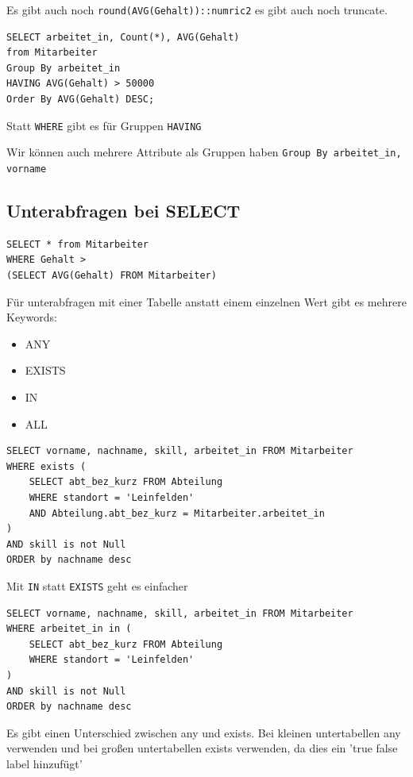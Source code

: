 \documentclass[a4paper]{article}
\begin{document}
Es gibt auch noch \lstinline|round(AVG(Gehalt))::numric2| es gibt auch noch truncate.

\begin{lstlisting}
SELECT arbeitet_in, Count(*), AVG(Gehalt)
from Mitarbeiter
Group By arbeitet_in
HAVING AVG(Gehalt) > 50000
Order By AVG(Gehalt) DESC;
\end{lstlisting}

Statt \lstinline|WHERE| gibt es für Gruppen \lstinline|HAVING|

Wir können auch mehrere Attribute als Gruppen haben \lstinline|Group By arbeitet_in, vorname|

\subsection{Unterabfragen bei SELECT}

\begin{lstlisting}
SELECT * from Mitarbeiter
WHERE Gehalt >
(SELECT AVG(Gehalt) FROM Mitarbeiter)
\end{lstlisting}

Für unterabfragen mit einer Tabelle anstatt einem einzelnen Wert gibt es mehrere Keywords:

\begin{itemize}
    \item ANY
    \item EXISTS
    \item IN
    \item ALL
\end{itemize}

\begin{lstlisting}
SELECT vorname, nachname, skill, arbeitet_in FROM Mitarbeiter
WHERE exists (
	SELECT abt_bez_kurz FROM Abteilung
	WHERE standort = 'Leinfelden'
	AND Abteilung.abt_bez_kurz = Mitarbeiter.arbeitet_in
)
AND skill is not Null
ORDER by nachname desc
\end{lstlisting}

Mit \lstinline|IN| statt \lstinline|EXISTS| geht es einfacher

\begin{lstlisting}
SELECT vorname, nachname, skill, arbeitet_in FROM Mitarbeiter
WHERE arbeitet_in in (
	SELECT abt_bez_kurz FROM Abteilung
	WHERE standort = 'Leinfelden'
)
AND skill is not Null
ORDER by nachname desc
\end{lstlisting}

Es gibt einen Unterschied zwischen any und exists. Bei kleinen untertabellen any verwenden und bei großen untertabellen exists verwenden, da dies ein 'true false label hinzufügt'
\end{document}
